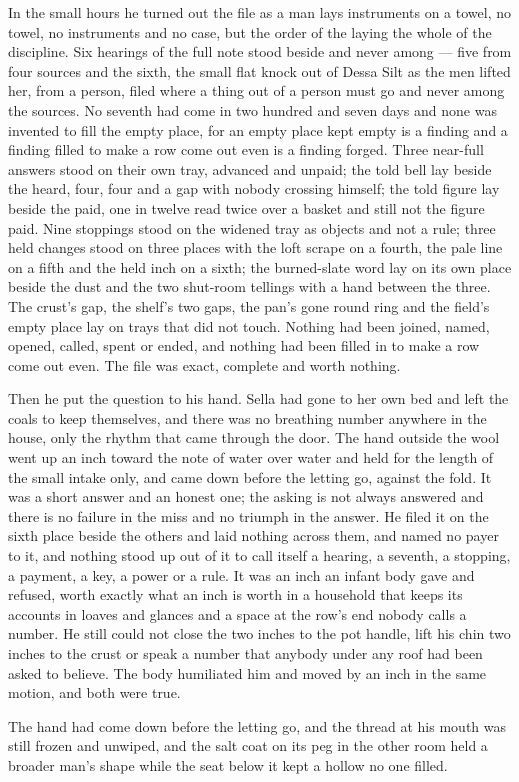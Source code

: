 In the small hours he turned out the file as a man lays instruments on a towel, no towel, no instruments and no case, but the order of the laying the whole of the discipline. Six hearings of the full note stood beside and never among --- five from four sources and the sixth, the small flat knock out of Dessa Silt as the men lifted her, from a person, filed where a thing out of a person must go and never among the sources. No seventh had come in two hundred and seven days and none was invented to fill the empty place, for an empty place kept empty is a finding and a finding filled to make a row come out even is a finding forged. Three near-full answers stood on their own tray, advanced and unpaid; the told bell lay beside the heard, four, four and a gap with nobody crossing himself; the told figure lay beside the paid, one in twelve read twice over a basket and still not the figure paid. Nine stoppings stood on the widened tray as objects and not a rule; three held changes stood on three places with the loft scrape on a fourth, the pale line on a fifth and the held inch on a sixth; the burned-slate word lay on its own place beside the dust and the two shut-room tellings with a hand between the three. The crust's gap, the shelf's two gaps, the pan's gone round ring and the field's empty place lay on trays that did not touch. Nothing had been joined, named, opened, called, spent or ended, and nothing had been filled in to make a row come out even. The file was exact, complete and worth nothing.

Then he put the question to his hand. Sella had gone to her own bed and left the coals to keep themselves, and there was no breathing number anywhere in the house, only the rhythm that came through the door. The hand outside the wool went up an inch toward the note of water over water and held for the length of the small intake only, and came down before the letting go, against the fold. It was a short answer and an honest one; the asking is not always answered and there is no failure in the miss and no triumph in the answer. He filed it on the sixth place beside the others and laid nothing across them, and named no payer to it, and nothing stood up out of it to call itself a hearing, a seventh, a stopping, a payment, a key, a power or a rule. It was an inch an infant body gave and refused, worth exactly what an inch is worth in a household that keeps its accounts in loaves and glances and a space at the row's end nobody calls a number. He still could not close the two inches to the pot handle, lift his chin two inches to the crust or speak a number that anybody under any roof had been asked to believe. The body humiliated him and moved by an inch in the same motion, and both were true.

The hand had come down before the letting go, and the thread at his mouth was still frozen and unwiped, and the salt coat on its peg in the other room held a broader man's shape while the seat below it kept a hollow no one filled.

